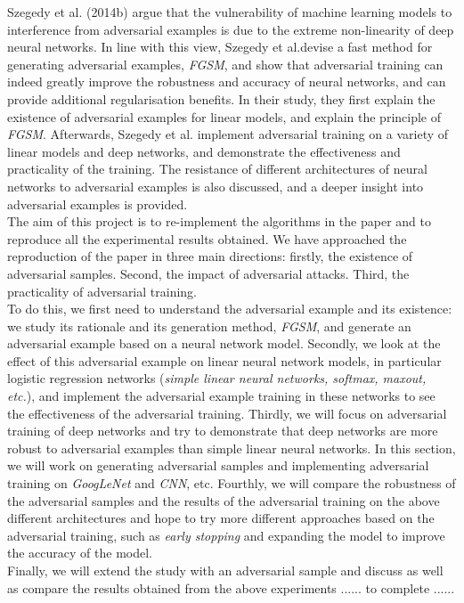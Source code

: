 


Szegedy et al. (2014b) argue that the vulnerability of machine learning models to interference from adversarial examples is due to the extreme non-linearity of deep neural networks. In line with this view, Szegedy et al.devise a fast method for generating adversarial examples, \textit{FGSM}, and show that adversarial training can indeed greatly improve the robustness and accuracy of neural networks, and can provide additional regularisation benefits. In their study, they first explain the existence of adversarial examples for linear models, and explain the principle of \textit{FGSM}. Afterwards, Szegedy et al. implement adversarial training on a variety of linear models and deep networks, and demonstrate the effectiveness and practicality of the training. The resistance of different architectures of neural networks to adversarial examples is also discussed, and a deeper insight into adversarial examples is provided.\\


The aim of this project is to re-implement the algorithms in the paper and to reproduce all the experimental results obtained. We have approached the reproduction of the paper in three main directions: firstly, the existence of adversarial samples. Second, the impact of adversarial attacks. Third, the practicality of adversarial training.\\


To do this, we first need to understand the adversarial example and its existence: we study its rationale and its generation method, \textit{FGSM}, and generate an adversarial example based on a neural network model. Secondly, we look at the effect of this adversarial example on linear neural network models, in particular logistic regression networks (\textit{simple linear neural networks, softmax, maxout, etc.}), and implement the adversarial example training in these networks to see the effectiveness of the adversarial training. Thirdly, we will focus on adversarial training of deep networks and try to demonstrate that deep networks are more robust to adversarial examples than simple linear neural networks. In this section, we will work on generating adversarial samples and implementing adversarial training on \textit{GoogLeNet} and \textit{CNN}, etc. Fourthly, we will compare the robustness of the adversarial samples and the results of the adversarial training on the above different architectures and hope to try more different approaches based on the adversarial training, such as  \textit{early stopping} and expanding the model to improve the accuracy of the model.\\

Finally, we will extend the study with an adversarial sample and discuss as well as compare the results obtained from the above experiments ...... to complete ......